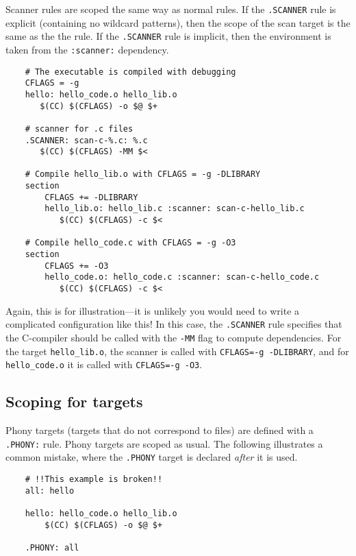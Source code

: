 Scanner rules are scoped the same way as normal rules.  If the \verb+.SCANNER+ rule is explicit
(containing no wildcard patterns), then the scope of the scan target is the same as the the rule.
If the \verb+.SCANNER+ rule is implicit, then the environment is taken from the \verb+:scanner:+
dependency.

\begin{verbatim}
    # The executable is compiled with debugging
    CFLAGS = -g
    hello: hello_code.o hello_lib.o
       $(CC) $(CFLAGS) -o $@ $+

    # scanner for .c files
    .SCANNER: scan-c-%.c: %.c
       $(CC) $(CFLAGS) -MM $<

    # Compile hello_lib.o with CFLAGS = -g -DLIBRARY
    section
        CFLAGS += -DLIBRARY
        hello_lib.o: hello_lib.c :scanner: scan-c-hello_lib.c
           $(CC) $(CFLAGS) -c $<

    # Compile hello_code.c with CFLAGS = -g -O3
    section
        CFLAGS += -O3
        hello_code.o: hello_code.c :scanner: scan-c-hello_code.c
           $(CC) $(CFLAGS) -c $<
\end{verbatim}

Again, this is for illustration---it is unlikely you would need to write a complicated configuration
like this!  In this case, the \verb+.SCANNER+ rule specifies that the C-compiler should be called
with the \verb+-MM+ flag to compute dependencies.  For the target \verb+hello_lib.o+, the scanner
is called with \verb+CFLAGS=-g -DLIBRARY+, and for \verb+hello_code.o+ it is called with
\verb+CFLAGS=-g -O3+.

\subsection{Scoping for  targets}
\label{section:PHONY-scoping}

Phony targets (targets that do not correspond to files) are defined with a \verb+.PHONY:+ rule.
Phony targets are scoped as usual.  The following illustrates a common mistake, where the
\verb+.PHONY+ target is declared \emph{after} it is used.

\begin{verbatim}
    # !!This example is broken!!
    all: hello

    hello: hello_code.o hello_lib.o
        $(CC) $(CFLAGS) -o $@ $+

    .PHONY: all
\end{verbatim}

